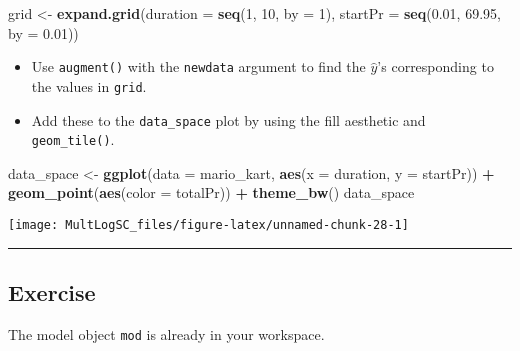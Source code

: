 \documentclass[]{book}
\newenvironment{Shaded}{\begin{snugshade}}{\end{snugshade}}
\newcommand{\KeywordTok}[1]{\textcolor[rgb]{0.13,0.29,0.53}{\textbf{#1}}}
\newcommand{\DataTypeTok}[1]{\textcolor[rgb]{0.13,0.29,0.53}{#1}}
\newcommand{\DecValTok}[1]{\textcolor[rgb]{0.00,0.00,0.81}{#1}}
\newcommand{\FloatTok}[1]{\textcolor[rgb]{0.00,0.00,0.81}{#1}}
\newcommand{\StringTok}[1]{\textcolor[rgb]{0.31,0.60,0.02}{#1}}
\newcommand{\OperatorTok}[1]{\textcolor[rgb]{0.81,0.36,0.00}{\textbf{#1}}}
\newcommand{\NormalTok}[1]{#1}
\begin{document}
\begin{Shaded}
\begin{Highlighting}[]
\NormalTok{grid <-}\StringTok{ }\KeywordTok{expand.grid}\NormalTok{(}\DataTypeTok{duration =} \KeywordTok{seq}\NormalTok{(}\DecValTok{1}\NormalTok{, }\DecValTok{10}\NormalTok{, }\DataTypeTok{by =} \DecValTok{1}\NormalTok{), }\DataTypeTok{startPr =} \KeywordTok{seq}\NormalTok{(}\FloatTok{0.01}\NormalTok{, }\FloatTok{69.95}\NormalTok{, }\DataTypeTok{by =} \FloatTok{0.01}\NormalTok{))}
\end{Highlighting}
\end{Shaded}

\begin{itemize}
\item
  Use \texttt{augment()} with the \texttt{newdata} argument to find the
  \(\hat{y}\)'s corresponding to the values in \texttt{grid}.
\item
  Add these to the \texttt{data\_space} plot by using the fill aesthetic
  and \texttt{geom\_tile()}.
\end{itemize}

\begin{Shaded}
\begin{Highlighting}[]
\NormalTok{data_space <-}\StringTok{ }\KeywordTok{ggplot}\NormalTok{(}\DataTypeTok{data =}\NormalTok{ mario_kart, }
                     \KeywordTok{aes}\NormalTok{(}\DataTypeTok{x =}\NormalTok{ duration, }\DataTypeTok{y =}\NormalTok{ startPr)) }\OperatorTok{+}\StringTok{ }
\StringTok{  }\KeywordTok{geom_point}\NormalTok{(}\KeywordTok{aes}\NormalTok{(}\DataTypeTok{color =}\NormalTok{ totalPr)) }\OperatorTok{+}\StringTok{ }
\StringTok{  }\KeywordTok{theme_bw}\NormalTok{()}
\NormalTok{data_space}
\end{Highlighting}
\end{Shaded}

\begin{center}\texttt{[image: MultLogSC\_files/figure-latex/unnamed-chunk-28-1]} \end{center}

\begin{center}\rule{0.5\linewidth}{\linethickness}\end{center}

\subsection*{Exercise}\label{exercise-9}

The model object \texttt{mod} is already in your workspace.
\end{document}
